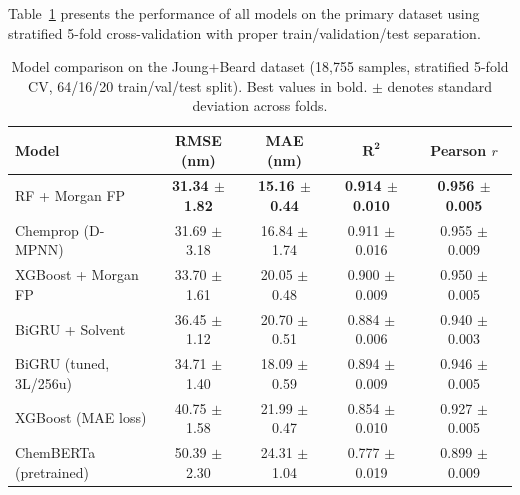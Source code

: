 \documentclass[journal=jcisd8,manuscript=article]{achemso}
\begin{document}
Table~\ref{tab:model_comparison} presents the performance of all models on the primary dataset using stratified 5-fold cross-validation with proper train/validation/test separation.

\begin{table}[htbp]
\centering
\caption{Model comparison on the Joung+Beard dataset (18,755 samples, stratified 5-fold CV, 64/16/20 train/val/test split). Best values in bold. $\pm$ denotes standard deviation across folds.}
\label{tab:model_comparison}
\begin{tabular}{lcccc}
\toprule
\textbf{Model} & \textbf{RMSE (nm)} & \textbf{MAE (nm)} & $\boldsymbol{R^2}$ & \textbf{Pearson $r$} \\
\midrule
RF + Morgan FP        & \textbf{31.34 $\pm$ 1.82} & \textbf{15.16 $\pm$ 0.44} & \textbf{0.914 $\pm$ 0.010} & \textbf{0.956 $\pm$ 0.005} \\
Chemprop (D-MPNN)     & 31.69 $\pm$ 3.18          & 16.84 $\pm$ 1.74          & 0.911 $\pm$ 0.016          & 0.955 $\pm$ 0.009 \\
XGBoost + Morgan FP   & 33.70 $\pm$ 1.61          & 20.05 $\pm$ 0.48          & 0.900 $\pm$ 0.009          & 0.950 $\pm$ 0.005 \\
BiGRU + Solvent       & 36.45 $\pm$ 1.12          & 20.70 $\pm$ 0.51          & 0.884 $\pm$ 0.006          & 0.940 $\pm$ 0.003 \\
BiGRU (tuned, 3L/256u)& 34.71 $\pm$ 1.40          & 18.09 $\pm$ 0.59          & 0.894 $\pm$ 0.009          & 0.946 $\pm$ 0.005 \\
XGBoost (MAE loss)    & 40.75 $\pm$ 1.58          & 21.99 $\pm$ 0.47          & 0.854 $\pm$ 0.010          & 0.927 $\pm$ 0.005 \\
ChemBERTa (pretrained)& 50.39 $\pm$ 2.30          & 24.31 $\pm$ 1.04          & 0.777 $\pm$ 0.019          & 0.899 $\pm$ 0.009 \\
\bottomrule
\end{tabular}
\end{table}
\end{document}
